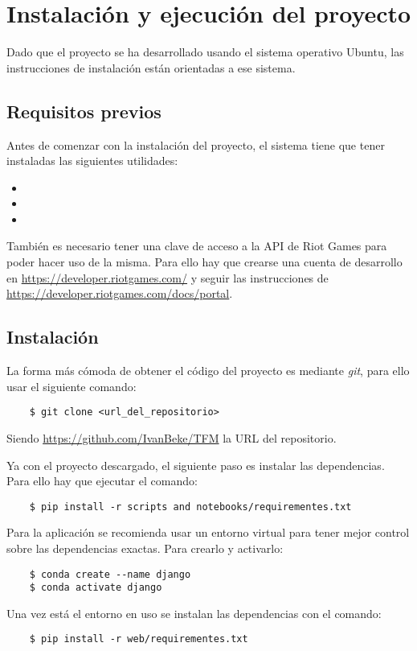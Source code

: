 \section{Instalación y ejecución del proyecto}
Dado que el proyecto se ha desarrollado usando el sistema operativo Ubuntu, las instrucciones de instalación están orientadas a ese sistema.

\subsection{Requisitos previos}
Antes de comenzar con la instalación del proyecto, el sistema tiene que tener instaladas las siguientes utilidades:
\begin{itemize}
	\item {}
	\item {}
	\item {}
\end{itemize}

También es necesario tener una clave de acceso a la API de Riot Games para poder hacer uso de la misma. Para ello hay que crearse una cuenta de desarrollo en \url{https://developer.riotgames.com/} y seguir las instrucciones de \url{https://developer.riotgames.com/docs/portal}.

\subsection{Instalación}\label{sec:instalacion}
La forma más cómoda de obtener el código del proyecto es mediante \textit{git}, para ello usar el siguiente comando:
\begin{lstlisting}
	$ git clone <url_del_repositorio>
\end{lstlisting}
Siendo \url{https://github.com/IvanBeke/TFM} la URL del repositorio.

Ya con el proyecto descargado, el siguiente paso es instalar las dependencias. Para ello hay que ejecutar el comando:
\begin{lstlisting}
	$ pip install -r scripts and notebooks/requirementes.txt
\end{lstlisting}
Para la aplicación se recomienda usar un entorno virtual para tener mejor control sobre las dependencias exactas. Para crearlo y activarlo:
\begin{lstlisting}
	$ conda create --name django
	$ conda activate django
\end{lstlisting}
Una vez está el entorno en uso se instalan las dependencias con el comando:
\begin{lstlisting}
	$ pip install -r web/requirementes.txt
\end{lstlisting}

